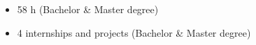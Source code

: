 
\begin{itemize}
	\item 58 h (Bachelor \& Master degree)
\end{itemize}

\begin{itemize}
	\item 4 internships and projects (Bachelor \& Master degree)
\end{itemize}










%
%
%




